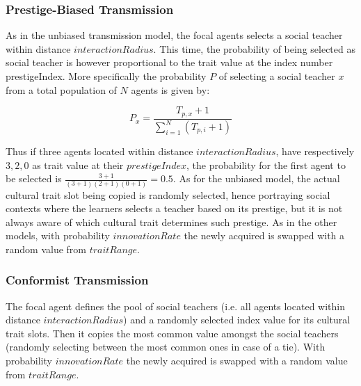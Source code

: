 \documentclass[11pt,a4paper,twocolumn,notitlepage]{article}
\begin{document}
\subsubsection{Prestige-Biased Transmission}

As in the unbiased transmission model, the focal agents selects a social teacher within distance $interactionRadius$. This time, the probability of being selected as social teacher is however proportional to the trait value at the index number prestigeIndex. More specifically the probability $P$ of selecting a social teacher $x$ from a total population of $N$ agents is given by:

$$ P_x = \frac{T_{p,x}+1}{\sum\limits_{i=1}^{N}{(T_{p,i}+1)}} $$

Thus if three agents located within distance $interactionRadius$, have respectively ${3,2,0}$ as trait value at their $prestigeIndex$, the probability for the first agent to be selected is $ \frac{3+1}{(3+1)(2+1)(0+1)} = 0.5$. As for the unbiased model, the actual cultural trait slot being copied is randomly selected, hence portraying social contexts where the learners selects a teacher based on its prestige, but it is not always aware of which cultural trait determines such prestige.  As in the other models, with probability $innovationRate$ the newly acquired is swapped with a random value from $traitRange$.

\subsubsection{Conformist Transmission}

The focal agent defines the pool of social teachers (i.e. all agents located within distance $interactionRadius$) and a randomly selected index value for its cultural trait slots. Then it copies the most common value amongst the social teachers (randomly selecting between the most common ones in case of a tie). With probability $innovationRate$ the newly acquired is swapped with a random value from $traitRange$.
\end{document}
